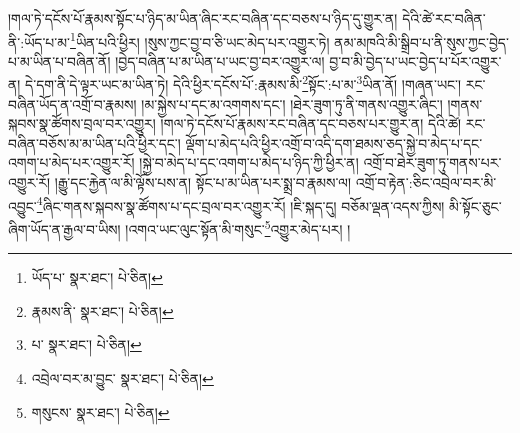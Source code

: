 །གལ་ཏེ་དངོས་པོ་རྣམས་སྟོང་པ་ཉིད་མ་ཡིན་ཞིང་རང་བཞིན་དང་བཅས་པ་ཉིད་དུ་གྱུར་ན། དེའི་ཚེ་རང་བཞིན་ནི་:ཡོད་པ་མ་\footnote{ཡོད་པ་  སྣར་ཐང་།  པེ་ཅིན། }ཡིན་པའི་ཕྱིར། །སུས་ཀྱང་བྱ་བ་ཅི་ཡང་མེད་པར་འགྱུར་ཏེ། ནམ་མཁའི་མི་སྒྲིབ་པ་ནི་སུས་ཀྱང་བྱེད་པ་མ་ཡིན་པ་བཞིན་ནོ། །བྱེད་བཞིན་པ་མ་ཡིན་པ་ཡང་བྱ་བར་འགྱུར་ལ། བྱ་བ་མི་བྱེད་པ་ཡང་བྱེད་པ་པོར་འགྱུར་ན། དེ་དག་ནི་དེ་ལྟར་ཡང་མ་ཡིན་ཏེ། དེའི་ཕྱིར་དངོས་པོ་:རྣམས་མི་\footnote{རྣམས་ནི་  སྣར་ཐང་།  པེ་ཅིན། }སྟོང་:པ་མ་\footnote{པ་  སྣར་ཐང་།  པེ་ཅིན། }ཡིན་ནོ། །གཞན་ཡང་། རང་བཞིན་ཡོད་ན་འགྲོ་བ་རྣམས། །མ་སྐྱེས་པ་དང་མ་འགགས་དང་། །ཐེར་ཟུག་ཏུ་ནི་གནས་འགྱུར་ཞིང་། །གནས་སྐབས་སྣ་ཚོགས་བྲལ་བར་འགྱུར། །གལ་ཏེ་དངོས་པོ་རྣམས་རང་བཞིན་དང་བཅས་པར་གྱུར་ན། དེའི་ཚེ། རང་བཞིན་བཅོས་མ་མ་ཡིན་པའི་ཕྱིར་དང་། ལྡོག་པ་མེད་པའི་ཕྱིར་འགྲོ་བ་འདི་དག་ཐམས་ཅད་སྐྱེ་བ་མེད་པ་དང་འགག་པ་མེད་པར་འགྱུར་རོ། །སྐྱེ་བ་མེད་པ་དང་འགག་པ་མེད་པ་ཉིད་ཀྱི་ཕྱིར་ན། འགྲོ་བ་ཐེར་ཟུག་ཏུ་གནས་པར་འགྱུར་རོ། །རྒྱུ་དང་རྐྱེན་ལ་མི་ལྟོས་པས་ན། སྟོང་པ་མ་ཡིན་པར་སྨྲ་བ་རྣམས་ལ། འགྲོ་བ་རྟེན་:ཅིང་འབྲེལ་བར་མི་འབྱུང་\footnote{འབྲེལ་བར་མ་བྱུང་  སྣར་ཐང་།  པེ་ཅིན། }ཞིང་གནས་སྐབས་སྣ་ཚོགས་པ་དང་བྲལ་བར་འགྱུར་རོ། །ཇི་སྐད་དུ། བཅོམ་ལྡན་འདས་ཀྱིས། མི་སྟོང་ཅུང་ཞིག་ཡོད་ན་རྒྱལ་བ་ཡིས། །འགའ་ཡང་ལུང་སྟོན་མི་གསུང་\footnote{གསུངས་  སྣར་ཐང་།  པེ་ཅིན། }འགྱུར་མེད་པར། །
